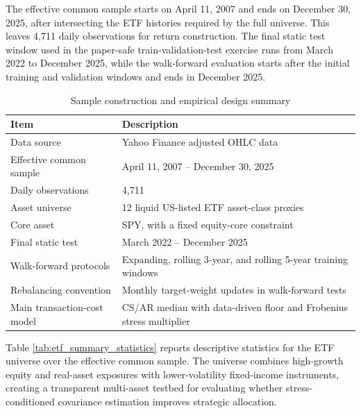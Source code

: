 \documentclass[11pt]{article}
\begin{document}
The effective common sample starts on April 11, 2007 and ends on December 30, 2025, after intersecting the ETF histories required by the full universe. This leaves 4,711 daily observations for return construction. The final static test window used in the paper-safe train-validation-test exercise runs from March 2022 to December 2025, while the walk-forward evaluation starts after the initial training and validation windows and ends in December 2025.

\begin{table}[h!]
\centering
\caption{Sample construction and empirical design summary}
\label{tab:sample_design}
\begin{tabular}{ll}
\toprule
Item & Description \\
\midrule
Data source & Yahoo Finance adjusted OHLC data \\
Effective common sample & April 11, 2007 -- December 30, 2025 \\
Daily observations & 4,711 \\
Asset universe & 12 liquid US-listed ETF asset-class proxies \\
Core asset & SPY, with a fixed equity-core constraint \\
Final static test & March 2022 -- December 2025 \\
Walk-forward protocols & Expanding, rolling 3-year, and rolling 5-year training windows \\
Rebalancing convention & Monthly target-weight updates in walk-forward tests \\
Main transaction-cost model & CS/AR median with data-driven floor and Frobenius stress multiplier \\
\bottomrule
\end{tabular}
\end{table}


Table \ref{tab:etf_summary_statistics} reports descriptive statistics for the ETF universe over the effective common sample. The universe combines high-growth equity and real-asset exposures with lower-volatility fixed-income instruments, creating a transparent multi-asset testbed for evaluating whether stress-conditioned covariance estimation improves strategic allocation.
\end{document}
